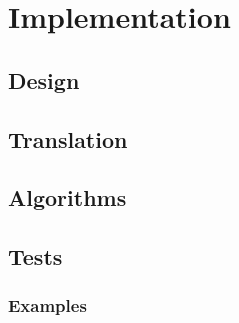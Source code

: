 
\part{Implementation}
\chapter{Design}

\chapter{Translation}

\chapter{Algorithms}

\chapter{Tests}

\section{Examples}
